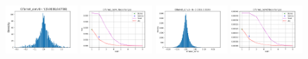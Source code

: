\begin{figure}[!ht]
\begin{minipage}[t]{1\textwidth}
            \includegraphics[width=0.24\textwidth]{ActualWeights/Cifarnet/conv1/Distribution.pdf}
            \includegraphics[width=0.24\textwidth]{ActualWeights/Cifarnet/conv1/LossWithWidth.pdf}
            \includegraphics[width=0.24\textwidth]{ActualWeights/Cifarnet/conv2/Distribution.pdf}
            \includegraphics[width=0.24\textwidth]{ActualWeights/Cifarnet/conv2/LossWithWidth.pdf}\\
            

\end{minipage}
\end{figure}

